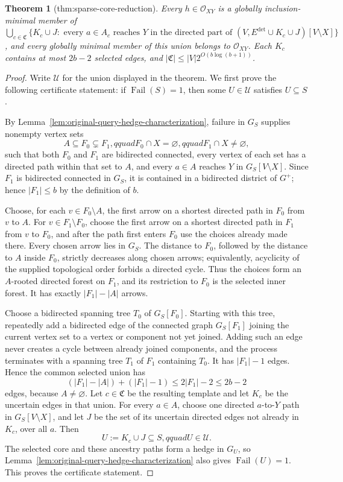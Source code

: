 \documentclass{article}
\newtheorem{theorem}{Theorem}
\begin{document}
\begin{theorem}[thm:sparse-core-reduction]\label{thm:sparse-core-reduction}
Every \(h\in\mathcal O_{XY}\) is a globally inclusion-minimal member of \(\bigcup_{c\in\mathfrak C}\{K_c\cup J:\text{ every }a\in A_c\text{ reaches }Y\text{ in the directed part of }(V,E^{\mathrm{det}}\cup K_c\cup J)[V\setminus X]\}\), and every globally minimal member of this union belongs to \(\mathcal O_{XY}\). Each \(K_c\) contains at most \(2b-2\) selected edges, and \(|\mathfrak C|\le |V|2^{O(b\log(b+1))}\).
\end{theorem}
\begin{proof}
Write \(\mathscr U\) for the union displayed in the theorem.  We first prove the following certificate statement: if \(\operatorname{Fail}(S)=1\), then some \(U\in\mathscr U\) satisfies \(U\subseteq S\).

By Lemma~\ref{lem:original-query-hedge-characterization}, failure in \(G_S\) supplies nonempty vertex sets
\[
 A\subseteq F_0\subsetneq F_1,qquad F_0\cap X=\varnothing,qquad F_1\cap X\ne\varnothing,
\]
such that both \(F_0\) and \(F_1\) are bidirected connected, every vertex of each set has a directed path within that set to \(A\), and every \(a\in A\) reaches \(Y\) in \(G_S[V\setminus X]\).  Since \(F_1\) is bidirected connected in \(G_S\), it is contained in a bidirected district of \(G^{+}\); hence \(|F_1|\le b\) by the definition of \(b\).

Choose, for each \(v\in F_0\setminus A\), the first arrow on a shortest directed path in \(F_0\) from \(v\) to \(A\).  For \(v\in F_1\setminus F_0\), choose the first arrow on a shortest directed path in \(F_1\) from \(v\) to \(F_0\), and after the path first enters \(F_0\) use the choices already made there.  Every chosen arrow lies in \(G_S\).  The distance to \(F_0\), followed by the distance to \(A\) inside \(F_0\), strictly decreases along chosen arrows; equivalently, acyclicity of the supplied topological order forbids a directed cycle.  Thus the choices form an \(A\)-rooted directed forest on \(F_1\), and its restriction to \(F_0\) is the selected inner forest.  It has exactly \(|F_1|-|A|\) arrows.

Choose a bidirected spanning tree \(T_0\) of \(G_S[F_0]\).  Starting with this tree, repeatedly add a bidirected edge of the connected graph \(G_S[F_1]\) joining the current vertex set to a vertex or component not yet joined.  Adding such an edge never creates a cycle between already joined components, and the process terminates with a spanning tree \(T_1\) of \(F_1\) containing \(T_0\).  It has \(|F_1|-1\) edges.  Hence the common selected union has
\[
 (|F_1|-|A|)+(|F_1|-1)
 \le 2|F_1|-2
 \le 2b-2
\]
edges, because \(A\ne\varnothing\).  Let \(c\in\mathfrak C\) be the resulting template and let \(K_c\) be the uncertain edges in that union.  For every \(a\in A\), choose one directed \(a\)-to-\(Y\) path in \(G_S[V\setminus X]\), and let \(J\) be the set of its uncertain directed edges not already in \(K_c\), over all \(a\).  Then
\[
 U:=K_c\cup J\subseteq S,qquad U\in\mathscr U.
\]
The selected core and these ancestry paths form a hedge in \(G_U\), so Lemma~\ref{lem:original-query-hedge-characterization} also gives \(\operatorname{Fail}(U)=1\).  This proves the certificate statement.


\end{proof}
\end{document}
